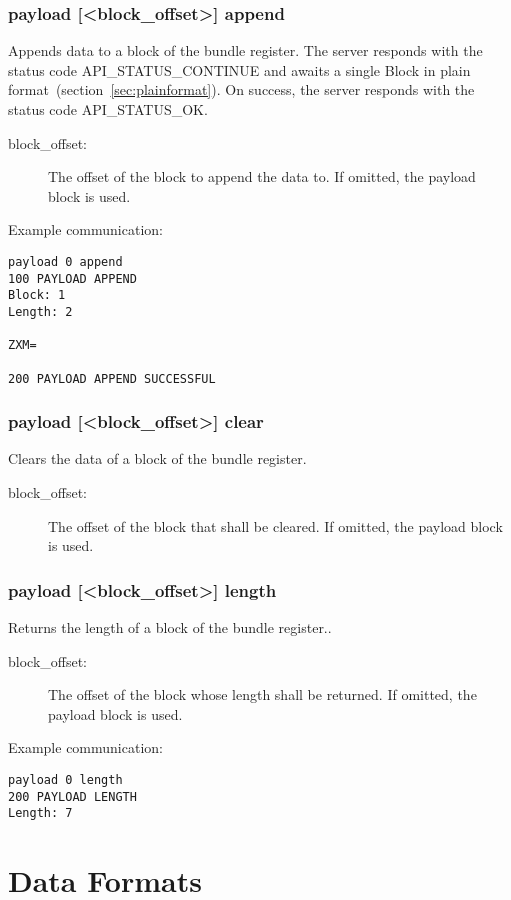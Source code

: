 \documentclass[12pt, a4paper]{scrartcl}
\begin{document}
\subsubsection*{payload [<block\_offset>] append}
Appends data to a block of the bundle register.
The server responds with the status code API\_STATUS\_CONTINUE and awaits a single Block in plain format~(section~\ref{sec:plainformat}).
On success, the server responds with the status code API\_STATUS\_OK.

\begin{description}
\item[block\_offset:] The offset of the block to append the data to.
	If omitted, the payload block is used.
\end{description}
Example communication:\\
\makebox[\textwidth]{\hrulefill}
\begin{verbatim}
payload 0 append
100 PAYLOAD APPEND
Block: 1
Length: 2

ZXM=

200 PAYLOAD APPEND SUCCESSFUL
\end{verbatim}
\makebox[\textwidth]{\hrulefill}
\subsubsection*{payload [<block\_offset>] clear}
Clears the data of a block of the bundle register.
\begin{description}
\item[block\_offset:] The offset of the block that shall be cleared.
	If omitted, the payload block is used.
\end{description}
\subsubsection*{payload [<block\_offset>] length}
Returns the length of a block of the bundle register..
\begin{description}
\item[block\_offset:] The offset of the block whose length shall be returned.
	If omitted, the payload block is used.
\end{description}
Example communication:\\
\makebox[\textwidth]{\hrulefill}
\begin{verbatim}
payload 0 length
200 PAYLOAD LENGTH
Length: 7
\end{verbatim}
\makebox[\textwidth]{\hrulefill}
\section{Data Formats}
\label{sec:formats}
\end{document}
